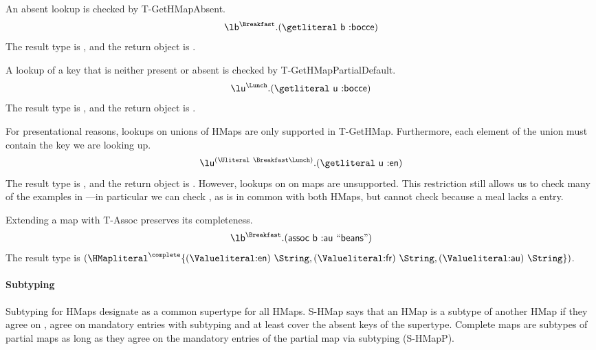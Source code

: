 An absent lookup is checked by T-GetHMapAbsent.
$$
\abs{\makelocal{b}}{\Breakfast}{\getexp{\makelocal{b}}{\makekw{bocce}}}
$$
The result type is \Nil, and the return object is .

A lookup of a key that is neither present or absent is checked by
T-GetHMapPartialDefault.
$$
\abs{\makelocal{u}}{\Lunch}{\getexp{\makelocal{u}}{\makekw{bocce}}}
$$
The result type is \Top, and the return object is .

For presentational reasons, lookups on unions of HMaps are only supported in T-GetHMap. 
Furthermore, each element of the union must contain the key we are looking up.
$$
\abs{\makelocal{u}}{\Unionsplice{\Breakfast \Lunch}}{\getexp{\makelocal{u}}{\makekw{en}}}
$$
The result type is \String, and the return object is .
However, lookups on  on {\Unionsplice{\Breakfast \Lunch}} maps are unsupported.
This restriction still allows us to check many of the examples in ---in
particular we can check 
, as  is in common with both HMaps,
but cannot check 
because a  meal lacks a  entry.

Extending a map with T-Assoc preserves its completeness.
$$
\abs{\makelocal{b}}{\Breakfast}{\assocexp{\makelocal{b}}{\makekw{au}}{\makestr{beans}}}
$$
The result type is
$
\HMapc{\mandatoryset{\mandatoryentrynoarrow{\Valkw{en}}{\String}, {\mandatoryentrynoarrow{\Valkw{fr}}{\String}}
        ,{\mandatoryentrynoarrow{\Valkw{au}}{\String}}}}
$.


\paragraph{Subtyping}
Subtyping for HMaps
designate \MapLiteral{} as a common supertype for all HMaps.
S-HMap says that an HMap is a subtype of another HMap if they agree
on \completenessmeta{}, agree on mandatory entries with subtyping
and at least cover the absent keys of the supertype.
Complete maps are subtypes of partial maps
as long as they agree on the mandatory entries of the partial map via subtyping (S-HMapP).


